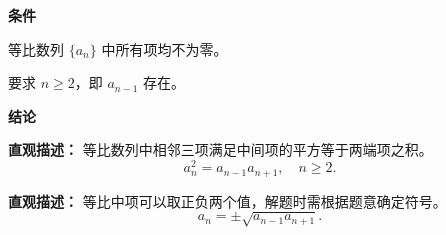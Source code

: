 \begin{statementbox}

	\textbf{\textcolor{CStatement}{条件}}
	\begin{description}[style=nextline, leftmargin=2.8em, labelsep=0.5em, itemsep=0.35em]
		\item[\textbf{\textcolor{CStatement}{条件1（各项非零）：}}] 等比数列 $\{a_n\}$ 中所有项均不为零。
		\item[\textbf{\textcolor{CStatement}{条件2（下标限制）：}}] 要求 $n\ge 2$，即 $a_{n-1}$ 存在。
	\end{description}

	\textbf{\textcolor{CStatement}{结论}}
	\begin{description}[style=nextline, leftmargin=2.8em, labelsep=0.5em, itemsep=0.45em]
		\item[\textbf{\textcolor{CStatement}{结论一（等比中项公式）：}}]
			\textbf{\textcolor{CStatement}{直观描述：}}
			等比数列中相邻三项满足中间项的平方等于两端项之积。
			\[
				a_n^2 = a_{n-1} a_{n+1}, \quad n\ge 2.
			\]

		\item[\textbf{\textcolor{CStatement}{推广结论（符号取舍）：}}]
			\textbf{\textcolor{CStatement}{直观描述：}}
			等比中项可以取正负两个值，解题时需根据题意确定符号。
			\[
				a_n = \pm \sqrt{a_{n-1} a_{n+1}}.
			\]
	\end{description}

\end{statementbox}
